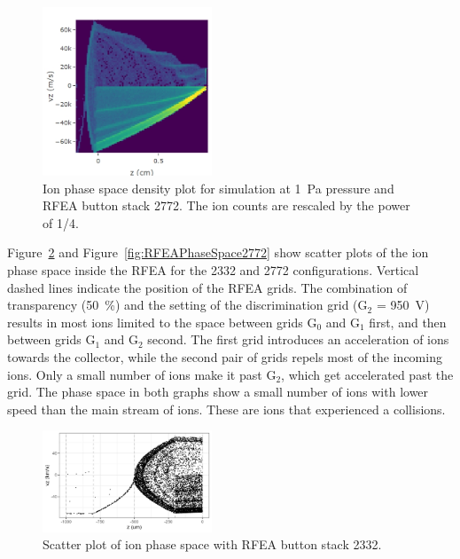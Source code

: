 \begin{figure}[htbp]
\centering
\includegraphics[width=0.45\textwidth]{Figures/ionPhaseSpace2772.jpeg}
\caption{Ion phase space density plot for simulation at 1~Pa pressure and RFEA button stack 2772. The ion counts are rescaled by the power of 1/4. }
\label{fig:ionPhaseSpace2772}
\end{figure}

Figure~\ref{fig:RFEAPhaseSpace2332} and Figure~\ref{fig:RFEAPhaseSpace2772} show scatter plots of the ion phase space inside the RFEA for the 2332 and 2772 configurations. Vertical dashed lines indicate the position of the RFEA grids. The combination of transparency (50~\%) and the setting of the discrimination grid (G$_2$ = 950~V) results in most ions limited to the space between grids G$_0$ and G$_1$ first, and then between grids G$_1$ and G$_2$ second. The first grid introduces an acceleration of ions towards the collector, while the second pair of grids repels most of the incoming ions. Only a small number of ions make it past G$_2$, which get accelerated past the grid. The phase space in both graphs show a small number of ions with lower speed than the main stream of ions. These are ions that experienced a collisions. 

\begin{figure}[htbp]
\centering
\includegraphics[width=0.45\textwidth]{Figures/RFEAPhaseSpace2332.jpeg}
\caption{Scatter plot of ion phase space with RFEA button stack 2332.}
\label{fig:RFEAPhaseSpace2332}
\end{figure}


